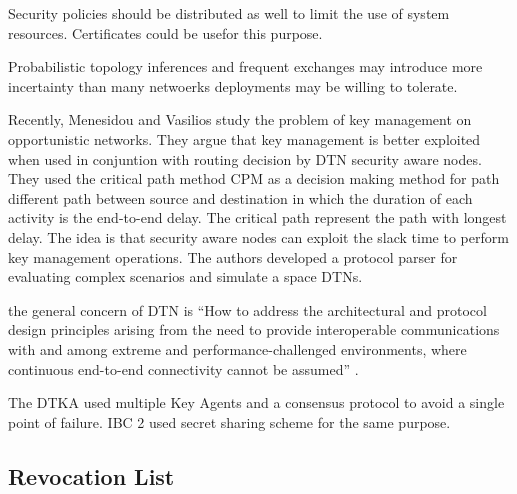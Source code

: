 Security policies should be distributed as well to limit the use of system resources. Certificates could be usefor this purpose. 

Probabilistic topology inferences and frequent exchanges may introduce more incertainty than many netwoerks deployments may be willing to tolerate. 

Recently, Menesidou and Vasilios \cite{menesidou2016automated} study the problem of key management on opportunistic networks. They argue that key management is better exploited when used in conjuntion with routing decision by DTN security aware nodes. They used the critical path method CPM as a decision making method for path different path between source and destination in which the duration of each activity is the end-to-end delay. The critical path represent the path with longest delay. The idea is that security aware nodes can exploit the slack time to perform key management operations. The authors developed a protocol parser for evaluating complex scenarios and simulate a space DTNs.

the general concern of DTN is ``How to address the architectural and protocol design principles
arising from the need to provide interoperable communications with and among extreme and performance-challenged environments, where continuous end-to-end connectivity cannot be assumed'' \cite{caini2011delay}.


The DTKA used multiple Key Agents and a consensus protocol to avoid a single point of failure. IBC 2 used secret sharing scheme for the same purpose. 

\subsection{Revocation List}